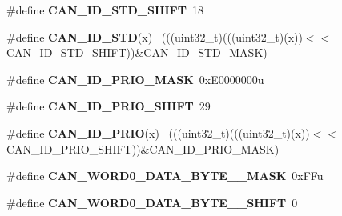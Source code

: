 \begin{DoxyCompactItemize}
\item 
\hypertarget{group___c_a_n___register___masks_gae8834f24b0aac84530ffd22f683ef5b4}{}\#define {\bfseries C\+A\+N\+\_\+\+I\+D\+\_\+\+S\+T\+D\+\_\+\+S\+H\+I\+F\+T}~18\label{group___c_a_n___register___masks_gae8834f24b0aac84530ffd22f683ef5b4}

\item 
\hypertarget{group___c_a_n___register___masks_ga12697f8d73c24a6dae455576db8d7ac0}{}\#define {\bfseries C\+A\+N\+\_\+\+I\+D\+\_\+\+S\+T\+D}(x)                                                    ~(((uint32\+\_\+t)(((uint32\+\_\+t)(x))$<$$<$C\+A\+N\+\_\+\+I\+D\+\_\+\+S\+T\+D\+\_\+\+S\+H\+I\+F\+T))\&C\+A\+N\+\_\+\+I\+D\+\_\+\+S\+T\+D\+\_\+\+M\+A\+S\+K)\label{group___c_a_n___register___masks_ga12697f8d73c24a6dae455576db8d7ac0}

\item 
\hypertarget{group___c_a_n___register___masks_gac1e36313ed3d0d09eec97537d3bda962}{}\#define {\bfseries C\+A\+N\+\_\+\+I\+D\+\_\+\+P\+R\+I\+O\+\_\+\+M\+A\+S\+K}~0x\+E0000000u\label{group___c_a_n___register___masks_gac1e36313ed3d0d09eec97537d3bda962}

\item 
\hypertarget{group___c_a_n___register___masks_ga7bd5cd878ee64f1b60ff983442ae7aa9}{}\#define {\bfseries C\+A\+N\+\_\+\+I\+D\+\_\+\+P\+R\+I\+O\+\_\+\+S\+H\+I\+F\+T}~29\label{group___c_a_n___register___masks_ga7bd5cd878ee64f1b60ff983442ae7aa9}

\item 
\hypertarget{group___c_a_n___register___masks_ga1c3cfdb5d213e867cbecaac120e8228b}{}\#define {\bfseries C\+A\+N\+\_\+\+I\+D\+\_\+\+P\+R\+I\+O}(x)                                                  ~(((uint32\+\_\+t)(((uint32\+\_\+t)(x))$<$$<$C\+A\+N\+\_\+\+I\+D\+\_\+\+P\+R\+I\+O\+\_\+\+S\+H\+I\+F\+T))\&C\+A\+N\+\_\+\+I\+D\+\_\+\+P\+R\+I\+O\+\_\+\+M\+A\+S\+K)\label{group___c_a_n___register___masks_ga1c3cfdb5d213e867cbecaac120e8228b}

\item 
\hypertarget{group___c_a_n___register___masks_ga2b8efb33402c5777d3d7b40c0c84eaac}{}\#define {\bfseries C\+A\+N\+\_\+\+W\+O\+R\+D0\+\_\+\+D\+A\+T\+A\+\_\+\+B\+Y\+T\+E\+\_\+\_\+\+M\+A\+S\+K}~0x\+F\+Fu\label{group___c_a_n___register___masks_ga2b8efb33402c5777d3d7b40c0c84eaac}

\item 
\hypertarget{group___c_a_n___register___masks_ga3835334fa3df07e17141619f9bdb33df}{}\#define {\bfseries C\+A\+N\+\_\+\+W\+O\+R\+D0\+\_\+\+D\+A\+T\+A\+\_\+\+B\+Y\+T\+E\+\_\+\_\+\+S\+H\+I\+F\+T}~0\label{group___c_a_n___register___masks_ga3835334fa3df07e17141619f9bdb33df}


\end{DoxyCompactItemize}

